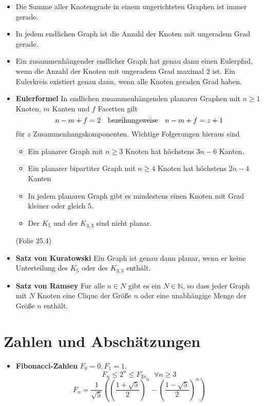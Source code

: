 \documentclass[landscape, 8pt, a4paper]{extarticle}
\newcommand{\N}{\mathbb{N}}
\begin{document}
\begin{multicols}{3}
	\begin{itemize}
		\item Die Summe aller Knotengrade in einem ungerichteten Graphen ist immer gerade.
		\item In jedem endlichen Graph ist die Anzahl der Knoten mit ungeradem Grad gerade.
		\item Ein zusammenhängender endlicher Graph hat genau dann einen Eulerpfad, wenn die Anzahl der Knoten mit ungeradem Grad maximal 2 ist. Ein Eulerkreis existiert genau dann, wenn alle Knoten geraden Grad haben.
		\item \textbf{Eulerformel} In endlichen zusammenhängenden planaren Graphen mit $n\geq 1$ Knoten, $m$ Kanten und $f$ Facetten gilt
		\begin{equation*}
			n-m+f=2\text{\quad bezeihungsweise\quad}n-m+f=z+1
		\end{equation*}
		für $z$ Zusammenhangskomponenten.
		Wichtige Folgerungen hieraus sind
		\begin{itemize}
			\item Ein planarer Graph mit $n\geq 3$ Knoten hat höchstens $3n-6$ Kanten.
			\item Ein planarer bipartiter Graph mit $n\geq 4$ Knoten hat höchstens $2n-4$ Kanten
			\item In jedem planaren Graph gibt es mindestens einen Knoten mit Grad kleiner oder gleich $5$.
			\item Der $K_5$ und der $K_{3,3}$ sind nicht planar.
		\end{itemize} (Folie 25.4)

		\item \textbf{Satz von Kuratowski} Ein Graph ist genau dann planar, wenn er keine Unterteilung des $K_5$ oder des $K_{3,3}$ enthält.

		\item \textbf{Satz von Ramsey} Fur alle $n\in N$ gibt es ein $N\in\N$, so dass jeder Graph mit $N$ Knoten eine Clique der Größe $n$ oder eine unabhängige Menge der Größe $n$ enthält.
	\end{itemize}

	\columnbreak

	\section{Zahlen und Abschätzungen}
	\begin{itemize}
		\item \textbf{Fibonacci-Zahlen} $F_0=0, F_1=1$. 
		\begin{equation*}
			F_{n}\leq 2^n\leq F_{2n}\quad \forall n\geq 3
		\end{equation*}
		\begin{equation*}
			F_n=\frac{1}{\sqrt 5}\left(\left(\frac{1+\sqrt 5}{2}\right)^n-\left(\frac{1-\sqrt 5}{2}\right)^n\right)
		\end{equation*}


\end{itemize}
\end{multicols}
\end{document}
